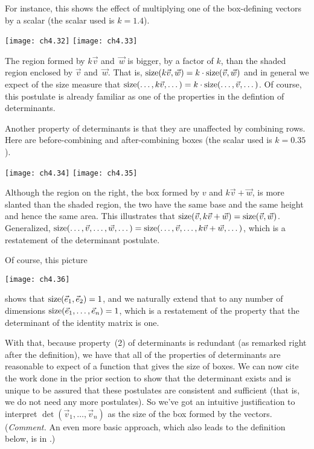 For instance, this shows    
the effect of multiplying one of the box-defining vectors by
a scalar (the scalar used is $k=1.4$).
\begin{center}
  \texttt{[image: ch4.32]}
  \qquad
  \texttt{[image: ch4.33]}
\end{center}
The region formed by $k\vec{v}$ and~$\vec{w}$
is bigger, by a factor of \( k \),
than the shaded region enclosed by $\vec{v}$ and~$\vec{w}$.
That is,
\( \operatorname{size} (k\vec{v},\vec{w})=k\cdot\operatorname{size} (\vec{v},\vec{w}) \) and
in general we expect of the size measure that
$\operatorname{size} (\dots,k\vec{v},\dots)=k\cdot\operatorname{size} (\dots,\vec{v},\dots)$.
Of course, this postulate is already familiar as 
one of the properties in the defintion of determinants.

Another property of determinants is that
they are unaffected by combining rows.
Here are before-combining and 
after-combining boxes (the scalar used is $k=0.35$). 
\begin{center}
  \texttt{[image: ch4.34]}
  \qquad
  \texttt{[image: ch4.35]}
\end{center}   
Although the region on the right, the box formed by $v$ and 
$k\vec{v}+\vec{w}$, is
more slanted than the shaded region, the two have the
same base and the same height and hence the same area.
This illustrates that
\( \operatorname{size} (\vec{v},k\vec{v}+\vec{w})=\operatorname{size} (\vec{v},\vec{w}) \).
Generalized, 
$\operatorname{size} (\dots,\vec{v},\dots,\vec{w},\dots)
=\operatorname{size} (\dots,\vec{v},\dots,k\vec{v}+\vec{w},\dots)$,
which is a restatement of the determinant postulate.

Of course, this picture
\begin{center}
  \texttt{[image: ch4.36]}
\end{center}
shows that \( \operatorname{size} (\vec{e}_1,\vec{e}_2)=1 \), 
and we naturally extend that to any number of dimensions
$\operatorname{size}(\vec{e}_1,\dots,\vec{e}_n)=1$,
which is a restatement of the property that the determinant of
the identity matrix is one.

With that, because property~(2) of determinants is 
redundant (as remarked right after the definition), 
we have that all of the properties of determinants are reasonable
to expect of a function that gives the size of boxes.
We can now cite the work done in the prior section to show
that the determinant exists and is unique to be 
assured that these postulates are consistent and sufficient
(that is, we do not need any more postulates).
So we've got an intuitive
justification to interpret \( \det(\vec{v}_1,\dots,\vec{v}_n) \) as the
size of the box formed by the vectors.
(\textit{Comment.}
  An even more basic approach, which also leads to the definition
  below, is in \cite{Weston59}.)

